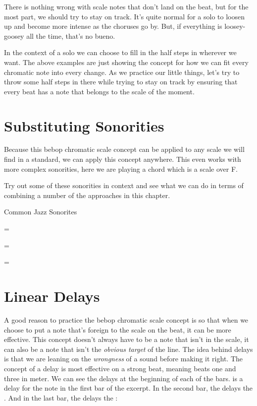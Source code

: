 
There is nothing wrong with scale notes that don't land on the beat, but for the most part, we should try to stay on track. It's quite normal for a solo to loosen up and become more intense as the choruses go by. But, if everything is loosey-goosey all the time, that's no bueno.

In the context of a solo we can choose to fill in the half steps in wherever we want. The above examples are just showing the concept for how we can fit every chromatic note into every change. As we practice our little things, let's try to throw some half steps in there while trying to stay on track by ensuring that every beat has a note that belongs to the scale of the moment.

\section{Substituting Sonorities}
Because this bebop chromatic scale concept can be applied to any scale we will find in a standard, we can apply this concept anywhere. This even works with more complex sonorities, here we are playing a  chord which is a  scale over F.


Try out some of these sonorities in context and see what we can do in terms of combining a number of the approaches in this chapter.

\begin{bookStyledList} {Common Jazz Sonorites}
	\item {} = 
	\item {} = 
	\item {} = 
\end{bookStyledList}

\section{Linear Delays}
A good reason to practice the bebop chromatic scale concept is so that when we choose to put a note that's foreign to the scale on the beat, it can be more effective. This concept doesn't always have to be a note that isn't in the scale, it can also be a note that isn't the \emph{obvious target} of the line. The idea behind delays is that we are leaning on the \emph{wrongness} of a sound before making it right. The concept of a delay is most effective on a strong beat, meaning beats one and three in  meter. We can see the delays at the beginning of each of the bars.  is a delay for the note  in the first bar of the excerpt. In the second bar, the  delays the . And in the last bar, the  delays the :

